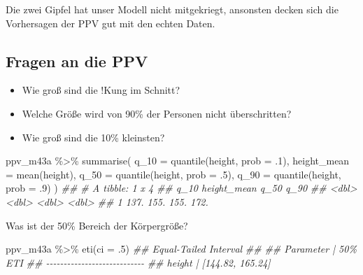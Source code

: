\documentclass[
  a4paper,
  DIV=11]{scrreprt}
\newenvironment{Shaded}{\begin{snugshade}}{\end{snugshade}}
\newcommand{\AttributeTok}[1]{\textcolor[rgb]{0.40,0.45,0.13}{#1}}
\newcommand{\DecValTok}[1]{\textcolor[rgb]{0.68,0.00,0.00}{#1}}
\newcommand{\DocumentationTok}[1]{\textcolor[rgb]{0.37,0.37,0.37}{\textit{#1}}}
\newcommand{\FunctionTok}[1]{\textcolor[rgb]{0.28,0.35,0.67}{#1}}
\newcommand{\NormalTok}[1]{\textcolor[rgb]{0.00,0.23,0.31}{#1}}
\newcommand{\SpecialCharTok}[1]{\textcolor[rgb]{0.37,0.37,0.37}{#1}}
\providecommand{\tightlist}{%
  \setlength{\itemsep}{0pt}\setlength{\parskip}{0pt}}\usepackage{longtable,booktabs,array}
\theoremstyle{definition}
\theoremstyle{remark}
\begin{document}
Die zwei Gipfel hat unser Modell nicht mitgekriegt, ansonsten decken
sich die Vorhersagen der PPV gut mit den echten Daten.

\hypertarget{fragen-an-die-ppv}{%
\subsection{Fragen an die PPV}\label{fragen-an-die-ppv}}

\begin{itemize}
\tightlist
\item
  Wie groß sind die !Kung im Schnitt?
\item
  Welche Größe wird von 90\% der Personen nicht überschritten?
\item
  Wie groß sind die 10\% kleinsten?
\end{itemize}

\begin{Shaded}
\begin{Highlighting}[]
\NormalTok{ppv\_m43a }\SpecialCharTok{\%\textgreater{}\%} 
  \FunctionTok{summarise}\NormalTok{(}
    \AttributeTok{q\_10 =} \FunctionTok{quantile}\NormalTok{(height, }\AttributeTok{prob =}\NormalTok{ .}\DecValTok{1}\NormalTok{),}
    \AttributeTok{height\_mean =} \FunctionTok{mean}\NormalTok{(height),}
    \AttributeTok{q\_50 =} \FunctionTok{quantile}\NormalTok{(height, }\AttributeTok{prob =}\NormalTok{ .}\DecValTok{5}\NormalTok{),}
    \AttributeTok{q\_90 =} \FunctionTok{quantile}\NormalTok{(height, }\AttributeTok{prob =}\NormalTok{ .}\DecValTok{9}\NormalTok{)}
\NormalTok{  )}
\DocumentationTok{\#\# \# A tibble: 1 x 4}
\DocumentationTok{\#\#    q\_10 height\_mean  q\_50  q\_90}
\DocumentationTok{\#\#   \textless{}dbl\textgreater{}       \textless{}dbl\textgreater{} \textless{}dbl\textgreater{} \textless{}dbl\textgreater{}}
\DocumentationTok{\#\# 1  137.        155.  155.  172.}
\end{Highlighting}
\end{Shaded}

Was ist der 50\% Bereich der Körpergröße?

\begin{Shaded}
\begin{Highlighting}[]
\NormalTok{ppv\_m43a }\SpecialCharTok{\%\textgreater{}\%} 
  \FunctionTok{eti}\NormalTok{(}\AttributeTok{ci =}\NormalTok{ .}\DecValTok{5}\NormalTok{)}
\DocumentationTok{\#\# Equal{-}Tailed Interval}
\DocumentationTok{\#\# }
\DocumentationTok{\#\# Parameter |          50\% ETI}
\DocumentationTok{\#\# {-}{-}{-}{-}{-}{-}{-}{-}{-}{-}{-}{-}{-}{-}{-}{-}{-}{-}{-}{-}{-}{-}{-}{-}{-}{-}{-}{-}}
\DocumentationTok{\#\# height    | [144.82, 165.24]}
\end{Highlighting}
\end{Shaded}
\end{document}
